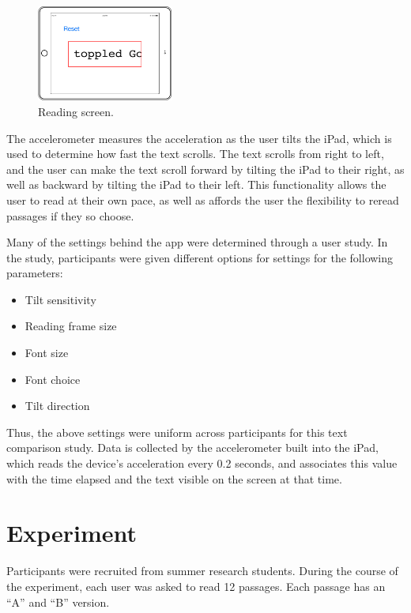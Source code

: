\documentclass[11pt,letterpaper]{article}
\begin{document}
	\begin{figure}[H]
		\centering
		\includegraphics[width=0.4\textwidth]{readingscreen.png}
		\caption{Reading screen.}
	\end{figure}
	
	The accelerometer measures the acceleration as the user tilts the iPad, which is used to determine how fast the text scrolls. The text scrolls from right to left, and the user can make the text scroll forward by tilting the iPad to their right, as well as backward by tilting the iPad to their left. This functionality allows the user to read at their own pace, as well as affords the user the flexibility to reread passages if they so choose.
	
	Many of the settings behind the app were determined through a user study. In the study, participants were given different options for settings for the following parameters:
	\begin{itemize}[noitemsep, nolistsep]
		\item Tilt sensitivity
		\item Reading frame size
		\item Font size
		\item Font choice
		\item Tilt direction
	\end{itemize}
	
	Thus, the above settings were uniform across participants for this text comparison study. Data is collected by the accelerometer built into the iPad, which reads the device's acceleration every 0.2 seconds, and associates this value with the time elapsed and the text visible on the screen at that time.
	
	\section{Experiment}
	\label{sec:exp}
	
	Participants were recruited from summer research students. During the course of the experiment, each user was asked to read 12 passages. Each passage has an ``A'' and ``B'' version.
	
\end{document}
